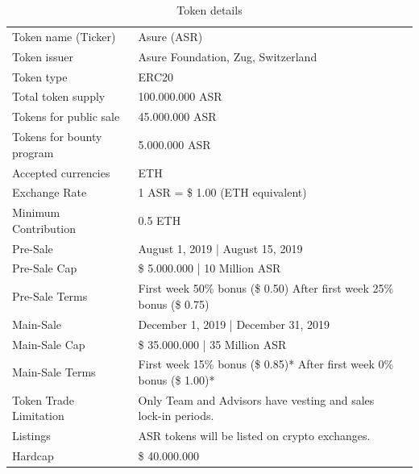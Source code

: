 \begin{table}[H]
\begin{tabular}{lp{}l}
  Token name (Ticker) & Asure (ASR) \\  
  Token issuer & Asure Foundation, Zug, Switzerland\\
  Token type & ERC20\\
  Total token supply & 100.000.000 ASR \\
  Tokens for public sale & 45.000.000 ASR \\
  Tokens for bounty program & 5.000.000 ASR \\
  Accepted currencies & ETH \\
  Exchange Rate & 1 ASR = \$ 1.00 (ETH equivalent) \\
  Minimum Contribution & 0.5 ETH \\\hline  
 
  Pre-Sale & August 1, 2019 | August 15, 2019 \\
  Pre-Sale Cap & \$ 5.000.000 | 10 Million ASR\\
  Pre-Sale Terms & First week 50\% bonus (\$ 0.50) \newline
                   After first week 25\% bonus (\$ 0.75)\\\hline
  
  Main-Sale & December 1, 2019 | December 31, 2019 \\
  Main-Sale Cap & \$ 35.000.000 | 35 Million ASR\\
  Main-Sale Terms & First week 15\% bonus (\$ 0.85)*\newline
                    After first week 0\% bonus (\$ 1.00)*\\\hline


  Token Trade Limitation & Only Team and Advisors have vesting and sales lock-in periods. \\
  Listings & ASR tokens will be listed on crypto exchanges. \\\hline     

  
  Hardcap & \$ 40.000.000
  
\end{tabular}
\caption{\label{tab:table-name}Token details}
\end{table}

